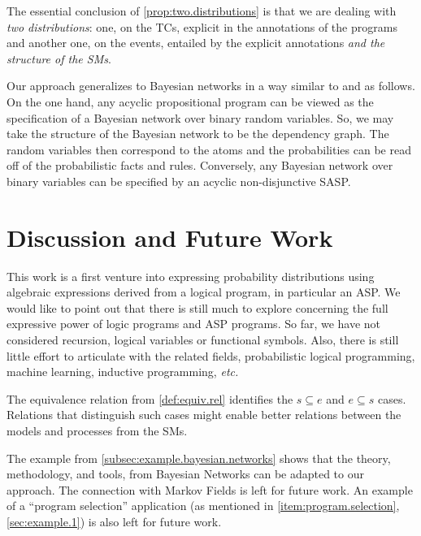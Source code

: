 \documentclass[a4paper]{article}
\renewcommand{\cite}{\citep}
\begin{document}
The essential conclusion of \cref{prop:two.distributions} is that we
are dealing with \emph{two distributions}: one, on the \aclp{TC},
explicit in the annotations of the programs and another one, on the
events, entailed by the explicit annotations \emph{and the structure
  of the \aclp{SM}}.

Our approach generalizes to Bayesian networks in a way similar to
\cite{cozman2020joy,raedt2016statistical} and
\cite{kiessling1992database,thone1997increased} as follows.  On the
one hand, any acyclic propositional program can be viewed as the
specification of a Bayesian network over binary random variables.  So,
we may take the structure of the Bayesian network to be the dependency
graph.  The random variables then correspond to the atoms and the
probabilities can be read off of the probabilistic facts and rules.
Conversely, any Bayesian network over binary variables can be
specified by an acyclic non-disjunctive \ac{SASP}.

%
%
%
\section{Discussion and Future Work}
%
%
%
This work is a first venture into expressing probability distributions
using algebraic expressions derived from a logical program, in
particular an \ac{ASP}.  We would like to point out that there is
still much to explore concerning the full expressive power of logic
programs and \ac{ASP} programs.  So far, we have not considered
recursion, logical variables or functional symbols.  Also, there is
still little effort to articulate with the related fields,
probabilistic logical programming, machine learning, inductive
programming, \emph{etc.}

The equivalence relation from \cref{def:equiv.rel} identifies the
$s \subseteq e$ and \(e \subseteq s\) cases.  Relations that
distinguish such cases might enable better relations between the
models and processes from the \aclp{SM}.

The example from \cref{subsec:example.bayesian.networks} shows that
the theory, methodology, and tools, from Bayesian Networks can be
adapted to our approach.  The connection with Markov Fields
\cite{kindermann80} is left for future work.  An example of a
``program selection'' application (as mentioned in
\cref{item:program.selection}, \cref{sec:example.1}) is also left for
future work.
\end{document}
